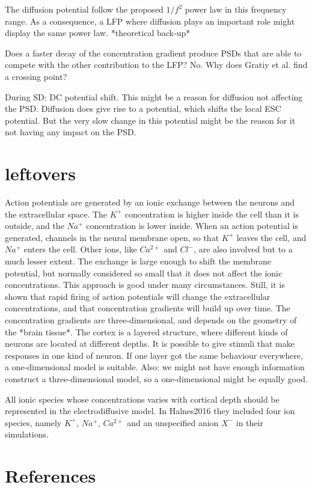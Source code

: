 \documentclass{article}
\begin{document}
The diffusion potential follow the proposed  $1/f^2$ power law in this frequency range. As a consequence, a LFP where diffusion plays an important role might display the same power law.  *theoretical back-up*

Does a faster decay of the concentration gradient produce PSDs that are able to compete with the other contribution to the LFP? No. Why does Gratiy et al. find a crossing point? 


During SD: DC potential shift. This might be a reason for diffusion not affecting the PSD. Diffusion does give rise to a potential, which shifts the local ESC potential. But the very slow change in this potential might be the reason for it not having any impact on the PSD.
\section{leftovers}
Action potentials are generated by an ionic exchange between the neurons and the extracellular space. The $K^+$ concentration is higher inside the cell than it is outside, and the $Na^+$ concentration is lower inside. When an action potential is generated,  channels in the neural membrane open, so that $K^+$ leaves the cell, and $Na^+$ enters the cell. Other ions, like $Ca^{2+}$ and $Cl^-$, are also involved but to a much lesser extent. The exchange is large enough to shift the membrane potential, but normally considered so small that it does not affect the ionic concentrations. This approach is good under many circumstances. Still, it is shown that rapid firing of action potentials will change the extracellular concentrations, and that concentration gradients will build up over time. The concentration gradients are three-dimensional, and depends on the geometry of the *brain tissue*.  The cortex is a layered structure, where different kinds of neurons are located at different depths. It is possible to give stimuli that make responses in one kind of neuron. If one layer got the same behaviour everywhere, a one-dimensional model is suitable. Also: we might not have enough information construct a three-dimensional model, so a one-dimensional might be equally good. 

All ionic species whose concentrations varies with cortical depth should be represented in the electrodiffusive model. In Halnes2016 they included four ion species, namely $K^+$, $Na^+$, $Ca^{2+}$ and an unspecified anion $X^-$ in their simulations.

\section{References}
\end{document}
